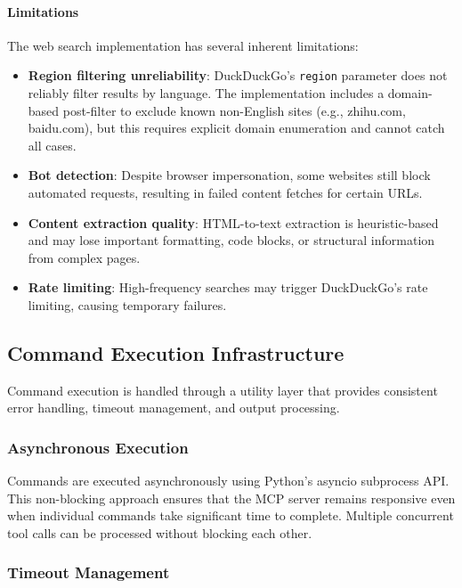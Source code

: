 \paragraph{Limitations}

The web search implementation has several inherent limitations:
\begin{itemize}
    \item \textbf{Region filtering unreliability}: DuckDuckGo's \texttt{region} parameter does not reliably filter results by language. The implementation includes a domain-based post-filter to exclude known non-English sites (e.g., zhihu.com, baidu.com), but this requires explicit domain enumeration and cannot catch all cases.
    \item \textbf{Bot detection}: Despite browser impersonation, some websites still block automated requests, resulting in failed content fetches for certain URLs.
    \item \textbf{Content extraction quality}: HTML-to-text extraction is heuristic-based and may lose important formatting, code blocks, or structural information from complex pages.
    \item \textbf{Rate limiting}: High-frequency searches may trigger DuckDuckGo's rate limiting, causing temporary failures.
\end{itemize}

\subsection{Command Execution Infrastructure}

Command execution is handled through a utility layer that provides consistent error handling, timeout management, and output processing.

\subsubsection{Asynchronous Execution}

Commands are executed asynchronously using Python's asyncio subprocess API. This non-blocking approach ensures that the MCP server remains responsive even when individual commands take significant time to complete. Multiple concurrent tool calls can be processed without blocking each other.

\subsubsection{Timeout Management}

